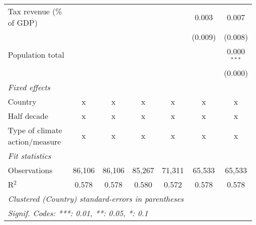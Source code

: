 \begin{tabular}{lcccccc}
   Tax revenue (\% of GDP)                  &         &               &               &               & 0.003         & 0.007\\   
                                            &         &               &               &               & (0.009)       & (0.008)\\   
   Population total                         &         &               &               &               &               & 0.000$^{***}$\\   
                                            &         &               &               &               &               & (0.000)\\   
   \emph{Fixed effects}\\
   Country                                  & x       & x             & x             & x             & x             & x\\  
   Half decade                              & x       & x             & x             & x             & x             & x\\  
   Type of climate action/measure           & x       & x             & x             & x             & x             & x\\  
   \midrule \emph{Fit statistics}\\
   Observations                             & 86,106  & 86,106        & 85,267        & 71,311        & 65,533        & 65,533\\  
   R$^2$                                    & 0.578   & 0.578         & 0.580         & 0.572         & 0.578         & 0.578\\  
   \midrule
   \multicolumn{7}{l}{\emph{Clustered (Country) standard-errors in parentheses}}\\
   \multicolumn{7}{l}{\emph{Signif. Codes: ***: 0.01, **: 0.05, *: 0.1}}\\
\end{tabular}
\par\endgroup


